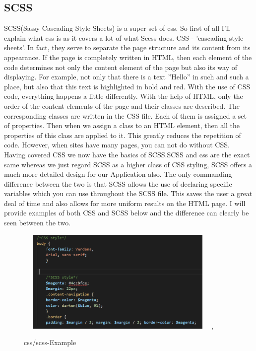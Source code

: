 \documentclass[12pt,a4paper,oneside,openany]{book}
\begin{document}
\subsection{SCSS}
SCSS(Sassy Cascading Style Sheets) is a super set of css. So first of all I'll explain what css is as it covers a lot of what Sccss does. CSS - 'cascading style sheets'. 
In fact, they serve to separate the page structure and its content from its appearance. If the page is completely written in HTML, then each element of the code determines not only the content element of the page but also its way of displaying. For example, not only that there is a text ”Hello” in such and such a place, but also that this text is highlighted in bold and red. With the use of CSS code, everything happens a little differently. 
With the help of HTML, only the order of the content elements of the page and their classes are described. The corresponding classes are written in the CSS file. Each of them is assigned a set of properties. Then when we assign a class to an HTML element, then all the properties of this class are applied to it. This greatly reduces the repetition of code. However, when sites have many pages, you can not do without CSS. \cite{css} \\

Having covered CSS we now have the basics of SCSS.SCSS and css are the exact same whereas we just regard SCSS as a higher class of CSS styling, SCSS offers a much more detailed design for our Application also. The only commanding difference between the two is that SCSS allows the use of declaring specific variables which you can use throughout the SCSS file. This saves the user a great deal of time and also allows for more uniform results on the HTML page. I will provide examples of both CSS and SCSS below and the difference can clearly be seen between the two.

\begin{figure}[ht]
\renewcommand\thefigure{4.5}
\centering
\includegraphics[width=10cm, height=5cm]{Images/scss.png},
\caption{css/scss-Example}
\label{scss}
\end{figure}
\end{document}
